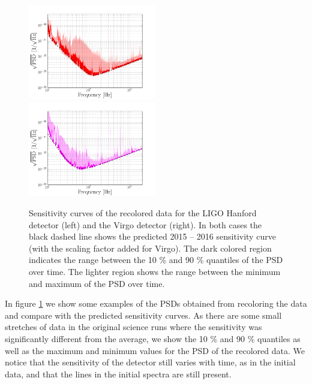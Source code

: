\begin{figure}
\centering
\includegraphics[width=0.495\textwidth]
{papers/mdc2013_submission/figure3A.png}
\includegraphics[width=0.495\textwidth]
{papers/mdc2013_submission/figure3B.png}
\caption{\label{fig:NOISE_recolored_sens}
Sensitivity curves of the recolored data for the LIGO Hanford detector (left)
and the Virgo detector (right). In both cases the black dashed line shows the
predicted 2015 -- 2016 sensitivity curve (with the scaling factor added for
Virgo). The dark colored region indicates the range between the 10 \% and 90 \%
quantiles of the PSD over time. The lighter region shows the range
between the minimum and maximum of the PSD over time.}
\end{figure}

In figure \ref{fig:NOISE_recolored_sens} we show some examples of the PSDs
obtained from recoloring the data and compare with
the predicted sensitivity curves. As there are some small stretches of data in
the original science runs where the sensitivity was significantly different
from the average, we show the 10 \% and 90 \% quantiles as well as the maximum 
and
minimum values for the PSD of the recolored data. We notice that the sensitivity
of the detector still varies with time, as in the initial data, and that the
lines in the initial spectra are still present.

